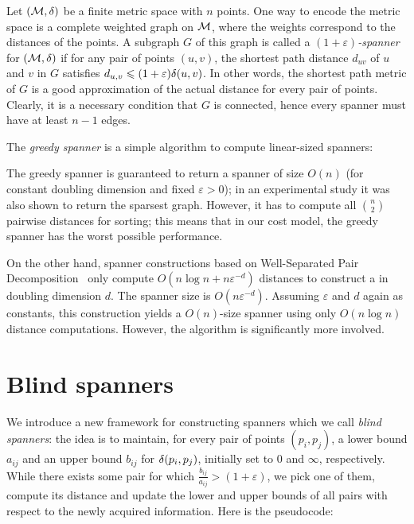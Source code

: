 \documentclass{ws-ijcga}
\renewcommand{\leq}{\leqslant}
\newcommand{\eps}{\varepsilon}
\begin{document}
%
Let $(\mathcal{M}, \delta)$ be a finite metric space with $n$ points. 
One way to encode the metric space is a complete weighted graph on $\mathcal{M}$,
where the weights correspond to the distances of the points.
A subgraph $G$ of this graph is called a \emph{$(1+\eps)$-spanner} for $(\mathcal{M},\delta)$ 
if for any pair of points $(u,v)$,
the shortest path distance $d_{uv}$ of $u$ and $v$ in $G$ satisfies $d_{u,v}\leq (1+\eps)\dist(u,v)$.
In other words, the shortest path metric of $G$ is a good approximation of the actual distance for every pair of points.
Clearly, it is a necessary condition that $G$ is connected, hence every spanner must have at least $n-1$ edges.

The \emph{greedy spanner} \cite{althofer1993sparse} is a simple algorithm to compute linear-sized spanners:
\begin{algorithmic}
\label{alg:greedy_spanner}
\Function{GreedySpanner}{$P, \eps$}
    \If{$d_{ij}>(1+\eps)\dist(p_i,p_j)$}
    \EndIf
    \EndFor
\EndFunction
\end{algorithmic}

The greedy spanner is guaranteed \cite{althofer1993sparse} to return a spanner of size $O(n)$
(for constant doubling dimension and fixed $\eps>0$); in an experimental study \cite{farshi2009experimental}
it was also shown to return the sparsest graph.  However, it
has to compute all $\binom{n}{2}$ pairwise distances for sorting;
this means that in our cost model, the greedy spanner has the worst possible
performance.

On the other hand, spanner constructions based on Well-Separated Pair Decomposition~\cite{cal-kos-wspd,hm-fast} only compute
$O(n\log n+n \eps^{-d})$ distances 
to construct a \espanner in doubling dimension $d$.
The spanner size is $O(n\eps^{-d})$. Assuming $\eps$ and $d$ again as constants,
this construction yields a $O(n)$-size spanner using only $O(n\log n)$ distance
computations. However, the algorithm is significantly more involved.

\section{Blind spanners}
\label{sec:blind_spanners}
%
We introduce a new framework for constructing spanners
which we call \emph{blind spanners}: the idea is to maintain,
for every pair of points $(p_i,p_j)$,
a lower bound $a_{ij}$ and an upper bound $b_{ij}$ for $\delta(p_i,p_j)$,
initially set to $0$ and $\infty$, respectively. While there exists some pair for which $\frac{b_{ij}}{a_{ij}}>(1+\eps)$,
we pick one of them, compute its distance and update the lower and upper bounds of
all pairs with respect to the newly acquired information. Here is the pseudocode:
\end{document}
